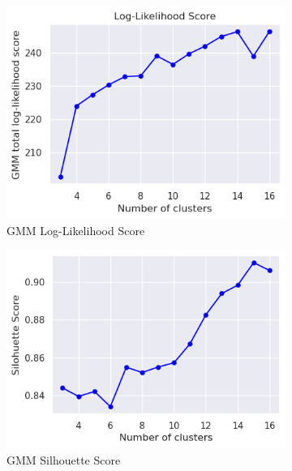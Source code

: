         \begin{figure}[H]
            \centering
            \begin{subfigure}[c]{0.47\textwidth}
                \centering
                \includegraphics[width=\textwidth]{../figures/plots/section3/gmm_total_log-likelihood_score.png}
                \caption{GMM Log-Likelihood Score}
                \label{fig:tsne_kmeans}
            \end{subfigure}
            \hfill
            \begin{subfigure}[c]{0.47\textwidth}
                \centering
                \includegraphics[width=\textwidth]{../figures/plots/section3/gmm_silohuette_score.png}
                \caption{GMM Silhouette Score}
                \label{fig:tsne_gmm}
            \end{subfigure}
            \vspace{-0.1cm}
            \caption{}
            \label{fig:}
        \end{figure}
    
